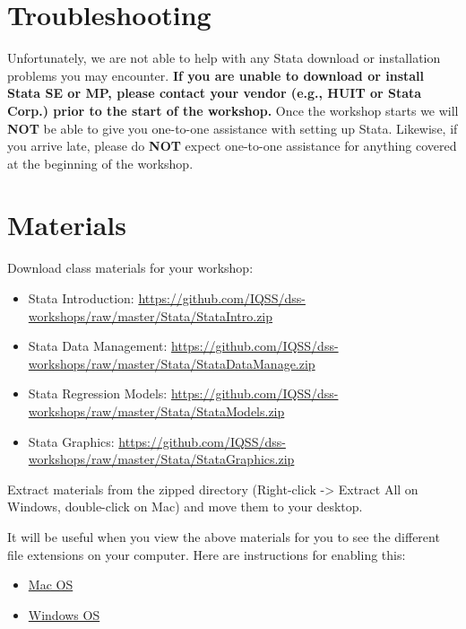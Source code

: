 \documentclass[
]{book}
\providecommand{\tightlist}{%
  \setlength{\itemsep}{0pt}\setlength{\parskip}{0pt}}
\begin{document}
\hypertarget{troubleshooting}{%
\section{Troubleshooting}\label{troubleshooting}}

Unfortunately, we are not able to help with any Stata download or installation problems you may encounter. \textbf{If you are unable to download or install Stata SE or MP, please contact your vendor (e.g., HUIT or Stata Corp.) prior to the start of the workshop.} Once the workshop starts we will \textbf{NOT} be able to give you one-to-one assistance with setting up Stata. Likewise, if you arrive late, please do \textbf{NOT} expect one-to-one assistance for anything covered at the beginning of the workshop.

\hypertarget{materials-2}{%
\section{Materials}\label{materials-2}}

Download class materials for your workshop:

\begin{itemize}
\tightlist
\item
  Stata Introduction: \url{https://github.com/IQSS/dss-workshops/raw/master/Stata/StataIntro.zip}
\item
  Stata Data Management: \url{https://github.com/IQSS/dss-workshops/raw/master/Stata/StataDataManage.zip}
\item
  Stata Regression Models: \url{https://github.com/IQSS/dss-workshops/raw/master/Stata/StataModels.zip}
\item
  Stata Graphics: \url{https://github.com/IQSS/dss-workshops/raw/master/Stata/StataGraphics.zip}
\end{itemize}

Extract materials from the zipped directory (Right-click -\textgreater{} Extract All on Windows, double-click on Mac) and move them to your desktop.

It will be useful when you view the above materials for you to see the different file extensions on your computer. Here are instructions for enabling this:

\begin{itemize}
\tightlist
\item
  \href{https://support.apple.com/guide/mac-help/show-or-hide-filename-extensions-on-mac-mchlp2304/mac}{Mac OS}
\item
  \href{http://kb.winzip.com/kb/entry/26/}{Windows OS}
\end{itemize}
\end{document}

